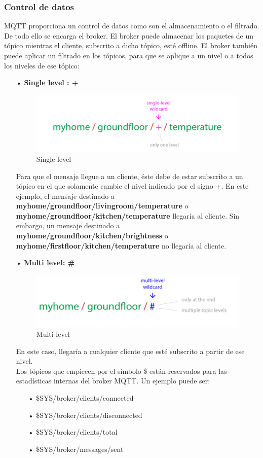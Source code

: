 \documentclass[12pt, twoside]{book}
\begin{document}
\subsubsection*{Control de datos}
MQTT proporciona un control de datos como son el almacenamiento o el filtrado. De todo ello se encarga el broker. El broker puede almacenar los paquetes de un tópico mientras el cliente, subscrito a dicho tópico, esté offline. El broker también puede aplicar un filtrado en los tópicos, para que se aplique a un nivel o a todos los niveles de ese tópico:
\begin{itemize}
\item[•]\textbf{Single level : +} \\
\begin{figure}[h!]
\centering
\includegraphics[scale=0.5]{images/figure4}
\caption{Single level}\label{L409}
\end{figure}
Para que el mensaje llegue a un cliente, éste debe de estar subscrito a un tópico en el que solamente cambie el nivel indicado por el signo +. En este ejemplo, el mensaje destinado a \textbf{myhome/groundfloor/livingroom/temperature} o \textbf{myhome/groundfloor/kitchen/temperature} llegaría al cliente. Sin embargo, un mensaje destinado a \textbf{myhome/groundfloor/kitchen/brightness} o \textbf{myhome/firstfloor/kitchen/temperature} no llegaría al cliente.
\item[•]\textbf{Multi level: \#}\\
\begin{figure}[h!]
\centering
\includegraphics[scale=0.5]{images/figure5}
\caption{Multi level}\label{L410}
\end{figure}
En este caso, llegaría a cualquier cliente que esté subscrito a partir de ese nivel.\\
Los tópicos que empiecen por el símbolo \$ están reservados para las estadísticas internas del broker MQTT. Un ejemplo puede ser:
\begin{itemize}
\item[•]\$SYS/broker/clients/connected
\item[•]\$SYS/broker/clients/disconnected
\item[•]\$SYS/broker/clients/total
\item[•]\$SYS/broker/messages/sent
\end{itemize}
\end{itemize}
\end{document}
